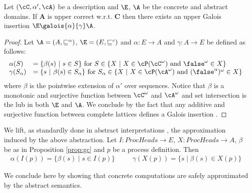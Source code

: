\documentclass{tlp}
\begin{document}
\begin{proposition}\label{prop:gc}
Let $(\cC,\alpha',\cA)$ be a description and $\E$,  $\A$ be  the concrete and  abstract domains.  If $\mathbf{A}$ is  upper correct w.r.t. $\mathbf{C}$  then there exists an upper Galois insertion $\E \galois{\alpha}{\gamma} \A$. 
\end{proposition}
\begin{proof}
Let $\A = (A , \sqsubseteq^\alpha)$, $\E = (E, \sqsubseteq^c)$ and   $\alpha:E \to A$ and $\gamma:A \to E $ be defined as follows:
\[
\begin{array}{ll}
\alpha(S) &= \{\beta(s) \ | \  s \in S\} \mbox{ for } S \in \{ X  \ | \  X \in \cP(\cC^\omega) \mbox{ and } \false^\omega \in X\}  \\
\gamma(S_\alpha) &= \{s \ |\  \beta(s) \in S_\alpha \} \mbox{ for } S_\alpha  \in \{ X \ | \ X \in \cP(\cA^\omega) \mbox { and } (\false^\alpha)^\omega \in X\}  
\end{array} 
\]
where $\beta$ is the pointwise extension of $\alpha'$ over sequences. Notice that $\beta$ is a monotonic and surjective function between $\cC^\omega$ and $\cA^\omega$ and set intersection is the lub in both $\E$ and $\A$. We conclude by the fact that any additive and surjective function between complete lattices defines a Galois insertion \cite{CC79}. 
\end{proof}

 We  lift, as  standardly done in abstract interpretations \cite{CC92},
the approximation induced by the above abstraction. 
Let $I: ProcHeads \rightarrow E$, $X: ProcHeads \rightarrow A$, $\beta$ be as in Proposition \ref{prop:gc} 
and $p$ be a process definition. Then
\[
\begin{array}{lll}
	\alpha(I(p)) = \{ \beta(s) \mid s \in I(p) \} & \quad & 
	\gamma(X(p)) = \{ s \mid \beta(s)\in X(p) \}
\end{array} 
\]





We conclude here by showing that concrete computations are safely  approximated by the abstract semantics. 
\end{document}
